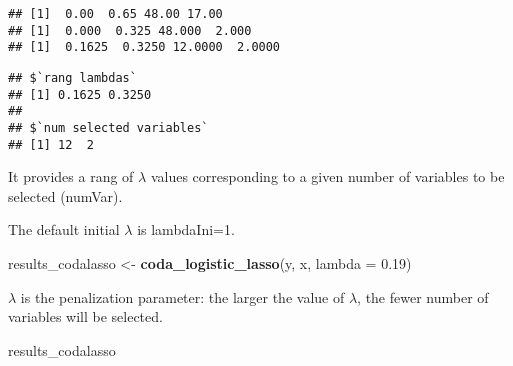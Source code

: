 \documentclass[]{book}
\newenvironment{Shaded}{\begin{snugshade}}{\end{snugshade}}
\newcommand{\KeywordTok}[1]{\textcolor[rgb]{0.13,0.29,0.53}{\textbf{#1}}}
\newcommand{\DataTypeTok}[1]{\textcolor[rgb]{0.13,0.29,0.53}{#1}}
\newcommand{\FloatTok}[1]{\textcolor[rgb]{0.00,0.00,0.81}{#1}}
\newcommand{\StringTok}[1]{\textcolor[rgb]{0.31,0.60,0.02}{#1}}
\newcommand{\NormalTok}[1]{#1}
\begin{document}
\begin{verbatim}
## [1]  0.00  0.65 48.00 17.00
## [1]  0.000  0.325 48.000  2.000
## [1]  0.1625  0.3250 12.0000  2.0000
\end{verbatim}

\begin{verbatim}
## $`rang lambdas`
## [1] 0.1625 0.3250
## 
## $`num selected variables`
## [1] 12  2
\end{verbatim}

It provides a rang of \(\lambda\) values corresponding to a given number
of variables to be selected (numVar).

The default initial \(\lambda\) is lambdaIni=1.

\begin{Shaded}
\begin{Highlighting}[]
\NormalTok{results_codalasso <-}\StringTok{ }\KeywordTok{coda_logistic_lasso}\NormalTok{(y, x, }\DataTypeTok{lambda =} \FloatTok{0.19}\NormalTok{)}
\end{Highlighting}
\end{Shaded}

\(\lambda\) is the penalization parameter: the larger the value of
\(\lambda\), the fewer number of variables will be selected.

\begin{Shaded}
\begin{Highlighting}[]
\NormalTok{results_codalasso}
\end{Highlighting}
\end{Shaded}
\end{document}
